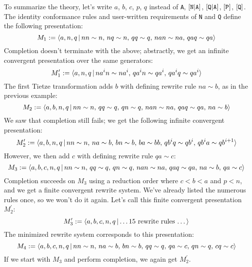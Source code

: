 \documentclass[../generics]{subfiles}
\begin{document}
\begin{example}
\smallskip

To summarize the theory, let's write $a$, $b$, $c$, $p$, $q$ instead of \texttt{A}, $[\texttt{N}|\texttt{A}]$, $[\texttt{Q}|\texttt{A}]$, $[\texttt{P}]$, $[\texttt{Q}]$. The identity conformance rules and user-written requirements of \texttt{N} and \texttt{Q} define the following presentation:
\[M_1 := \langle a,n,q\,|\,nn\sim n,\, nq\sim n,\, qq\sim q,\,nan\sim na,\,qaq\sim qa\rangle\]
Completion doesn't terminate with the above; abstractly, we get an infinite convergent presentation over the same generators:
\[M_1^\prime := \langle a,n,q\,|\,na^in\sim na^i,\, qa^in\sim qa^i,\,qa^iq\sim qa^i\rangle\]
The first Tietze transformation adds $b$ with defining rewrite rule $na\sim b$, as in the previous example:
\[M_2 := \langle a,b,n,q\,|\,nn\sim n,\, qq\sim q,\, qn\sim q,\, nan\sim na,\,qaq\sim qa,\,na\sim b\rangle\]
We saw that completion still fails; we get the following infinite convergent presentation:
\[M_2^{\prime} := \langle a,b,n,q\,|\,nn\sim n,\,na\sim b,\,bn\sim b,\,ba\sim bb,\,qb^iq\sim qb^i,\, qb^ia\sim qb^{i+1}\rangle\]
However, we then add $c$ with defining rewrite rule $qa\sim c$:
\[M_3 := \langle a,b,c,n,q\,|\,nn\sim n,\, qq\sim q,\, qn\sim q,\, nan\sim na,\,qaq\sim qa,\,na\sim b,\,qa\sim c\rangle\]
Completion succeeds on $M_3$ using a reduction order where $c<b<a$ and $p<n$, and we get a finite convergent rewrite system. We've already listed the numerous rules once, so we won't do it again. Let's call this finite convergent presentation $M_2^\prime$:
\[M_3^\prime := \langle a,b,c,n,q\,|\,\mbox{\ldots 15 rewrite rules \ldots}\rangle\]
The minimized rewrite system corresponds to this presentation:
\[M_4 :=\langle a,b,c,n,q\,|\,nn\sim n,\, na\sim b,\, bn\sim b,\, qq\sim q,\, qa\sim c,\, qn\sim q,\, cq\sim c\rangle\]
If we start with $M_3$ and perform completion, we again get $M_2^\prime$.
\end{example}
\end{document}
